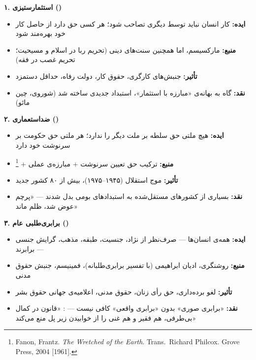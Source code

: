 \begin{tcolorbox}[wavebox, title={ایده‌هایی که جهان را تغییر دادند}]

\textbf{۱. استثمارستیزی ()}
\begin{itemize}
\item \textbf{ایده:} کار انسان نباید توسط دیگری تصاحب شود؛ هر کسی حق
  دارد از حاصل کار خود بهره‌مند شود
\item \textbf{منبع:} مارکسیسم، اما همچنین سنت‌های دینی (تحریم ربا در
  اسلام و مسیحیت؛ تحریم غصب در فقه)
\item \textbf{تأثیر:} جنبش‌های کارگری، حقوق کار، دولت رفاه، حداقل
  دستمزد
\item \textbf{نقد:} گاه به بهانه‌ی «مبارزه با استثمار»، استبداد جدیدی
  ساخته شد (شوروی، چین مائو)
\end{itemize}

\tcblower

\textbf{۲. ضداستعماری ()}
\begin{itemize}
\item \textbf{ایده:} هیچ ملتی حق سلطه بر ملت دیگر را ندارد؛ هر ملتی
  حق حکومت بر سرنوشت خود دارد
\item \textbf{منبع:} ترکیب حق تعیین سرنوشت + مبارزه‌ی عملی +
  \footnote{Fanon, Frantz. \textit{The Wretched of
  the Earth}. Trans.\ Richard Philcox. Grove Press, 2004 [1961].}
\item \textbf{تأثیر:} موج استقلال (۱۹۴۵–۱۹۷۵)، بیش از ۸۰ کشور جدید
\item \textbf{نقد:} بسیاری از کشورهای مستقل‌شده به استبدادهای بومی بدل
  شدند — «پرچم عوض شد، ظلم ماند»
\end{itemize}

\tcblower

\textbf{۳. برابری‌طلبی عام ()}
\begin{itemize}
\item \textbf{ایده:} همه‌ی انسان‌ها — صرف‌نظر از نژاد، جنسیت، طبقه،
  مذهب، گرایش جنسی — برابرند
\item \textbf{منبع:} روشنگری، ادیان ابراهیمی (با تفسیر برابری‌طلبانه)،
  فمینیسم، جنبش حقوق مدنی
\item \textbf{تأثیر:} لغو برده‌داری، حق رأی زنان، حقوق مدنی، اعلامیه‌ی
  جهانی حقوق بشر
\item \textbf{نقد:} «برابری صوری» بدون «برابری واقعی» کافی نیست —
  : «قانون در کمال بی‌طرفی، هم فقیر و هم غنی را از
  خوابیدن زیر پل منع می‌کند»
\end{itemize}


\end{tcolorbox}
